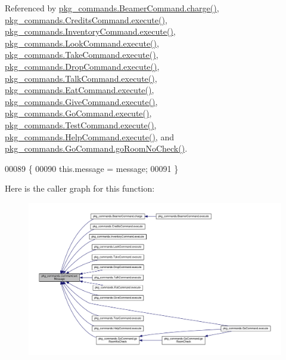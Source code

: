 Referenced by \hyperlink{BeamerCommand_8java_source_l00067}{pkg\-\_\-commands.\-Beamer\-Command.\-charge()}, \hyperlink{CreditsCommand_8java_source_l00023}{pkg\-\_\-commands.\-Credits\-Command.\-execute()}, \hyperlink{InventoryCommand_8java_source_l00023}{pkg\-\_\-commands.\-Inventory\-Command.\-execute()}, \hyperlink{LookCommand_8java_source_l00026}{pkg\-\_\-commands.\-Look\-Command.\-execute()}, \hyperlink{TakeCommand_8java_source_l00027}{pkg\-\_\-commands.\-Take\-Command.\-execute()}, \hyperlink{DropCommand_8java_source_l00027}{pkg\-\_\-commands.\-Drop\-Command.\-execute()}, \hyperlink{TalkCommand_8java_source_l00027}{pkg\-\_\-commands.\-Talk\-Command.\-execute()}, \hyperlink{EatCommand_8java_source_l00028}{pkg\-\_\-commands.\-Eat\-Command.\-execute()}, \hyperlink{GiveCommand_8java_source_l00029}{pkg\-\_\-commands.\-Give\-Command.\-execute()}, \hyperlink{GoCommand_8java_source_l00032}{pkg\-\_\-commands.\-Go\-Command.\-execute()}, \hyperlink{TestCommand_8java_source_l00032}{pkg\-\_\-commands.\-Test\-Command.\-execute()}, \hyperlink{HelpCommand_8java_source_l00033}{pkg\-\_\-commands.\-Help\-Command.\-execute()}, and \hyperlink{GoCommand_8java_source_l00071}{pkg\-\_\-commands.\-Go\-Command.\-go\-Room\-No\-Check()}.


\begin{DoxyCode}
00089                                               \{
00090         this.message = message;
00091     \}
\end{DoxyCode}


Here is the caller graph for this function\-:
\nopagebreak
\begin{figure}[H]
\begin{center}
\leavevmode
\includegraphics[width=350pt]{classpkg__commands_1_1Command_ae210ff216fe908b111ba1c988a963d13_icgraph}
\end{center}
\end{figure}


